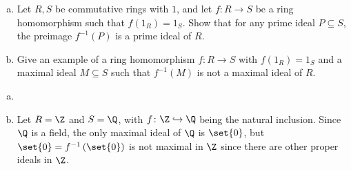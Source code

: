 \documentclass[10pt]{mypackage}
\begin{document}
\RaggedRight
\begin{problem}[Problem 4]\hfill
  \begin{enumerate}[(a)]
    \item Let $R,S$ be commutative rings with $1$, and let $f\colon R\rightarrow S$ be a ring homomorphism such that $f\left( 1_R \right) = 1_S$. Show that for any prime ideal $ P\subseteq S $, the preimage $f^{-1}\left( P \right)$ is a prime ideal of $R$.
    \item Give an example of a ring homomorphism $f\colon R\rightarrow S$ with $f\left( 1_{R} \right) = 1_S$ and a maximal ideal $M\subseteq S$ such that $f^{-1}\left( M \right)$ is not a maximal ideal of $R$.
  \end{enumerate}
\end{problem}
\begin{solution}\hfill
  \begin{enumerate}[(a)]
    \item 
    \item Let $R = \Z$ and $S = \Q$, with $f\colon \Z\hookrightarrow \Q$ being the natural inclusion. Since $\Q$ is a field, the only maximal ideal of $\Q$ is $\set{0}$, but $\set{0} = f^{-1}\left( \set{0} \right)$ is not maximal in $\Z$ since there are other proper ideals in $\Z$.
  \end{enumerate}
\end{solution}
\end{document}
